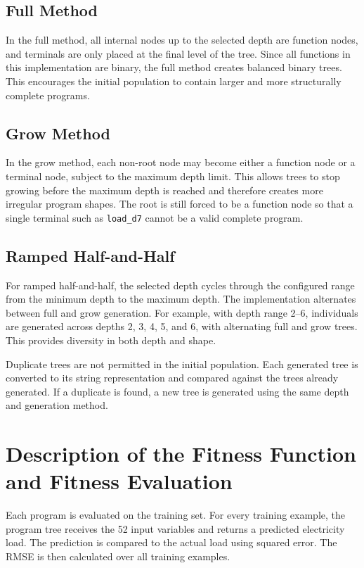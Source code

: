 \documentclass{article}
\begin{document}
\subsection{Full Method}

In the full method, all internal nodes up to the selected depth are function nodes, and terminals are only placed at the final level of the tree. Since all functions in this implementation are binary, the full method creates balanced binary trees. This encourages the initial population to contain larger and more structurally complete programs.

\subsection{Grow Method}

In the grow method, each non-root node may become either a function node or a terminal node, subject to the maximum depth limit. This allows trees to stop growing before the maximum depth is reached and therefore creates more irregular program shapes. The root is still forced to be a function node so that a single terminal such as \texttt{load\_d7} cannot be a valid complete program.

\subsection{Ramped Half-and-Half}

For ramped half-and-half, the selected depth cycles through the configured range from the minimum depth to the maximum depth. The implementation alternates between full and grow generation. For example, with depth range 2--6, individuals are generated across depths 2, 3, 4, 5, and 6, with alternating full and grow trees. This provides diversity in both depth and shape.

Duplicate trees are not permitted in the initial population. Each generated tree is converted to its string representation and compared against the trees already generated. If a duplicate is found, a new tree is generated using the same depth and generation method.

\section{Description of the Fitness Function and Fitness Evaluation}

Each program is evaluated on the training set. For every training example, the program tree receives the 52 input variables and returns a predicted electricity load. The prediction is compared to the actual load using squared error. The RMSE is then calculated over all training examples.
\end{document}
